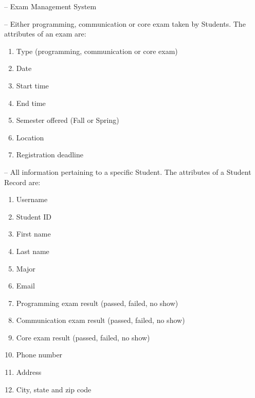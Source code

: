 
\begin{description}
   \label{def:exam}
   \label{def:record} 
   \item[EMS] -- Exam Management System 
   \item[Exams] --  Either programming,
      communication or core exam taken by Students. The attributes of an exam
      are:
      \begin{enumerate}
         \item Type (programming, communication or core exam)
         \item Date
         \item Start time
         \item End time
         \item Semester offered (Fall or Spring)
         \item Location
         \item Registration deadline
      \end{enumerate}
   \item[Student record]--  All
      information pertaining to a specific Student. The attributes of a Student
      Record are:
      \begin{enumerate}
         \item Username
         \item Student ID
         \item First name
         \item Last name
         \item Major
         \item Email
         \item Programming exam result (passed, failed, no show)
         \item Communication exam result (passed, failed, no show)
         \item Core exam result (passed, failed, no show)
         \item Phone number
         \item Address
         \item City, state and zip code
      \end{enumerate}
\end{description}

